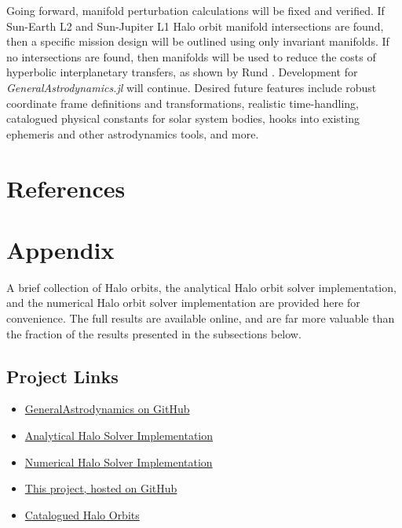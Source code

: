 \documentclass[conf]{new-aiaa}
\renewcommand\refname{}
\begin{document}
\begin{multicols}{2}
Going forward, manifold perturbation calculations will be fixed and verified.
If Sun-Earth L2 and Sun-Jupiter L1 Halo orbit manifold intersections are 
found, then a specific mission design will be 
outlined using only invariant manifolds. If no intersections are found,
then manifolds will be used to reduce the costs of hyperbolic 
interplanetary transfers, as shown by Rund \cite{rund2018interplanetary}.
Development for \textit{GeneralAstrodynamics.jl} will continue. Desired 
future features include robust coordinate frame definitions and 
transformations, realistic time-handling, catalogued physical constants 
for solar system bodies, hooks into existing ephemeris and other 
astrodynamics tools, and more. 

\section{References}
\nocite{*}
\renewcommand\refname{\vskip -0.9cm}


\end{multicols}

\section{Appendix}

A brief collection of Halo orbits, the analytical Halo orbit solver
implementation, and the numerical Halo orbit solver implementation 
are provided here for convenience. The full results are available online,
and are far more valuable than the fraction of the results presented in 
the subsections below. 

\subsection*{Project Links}
\begin{itemize}
    \item \href{https://github.com/cadojo/GeneralAstrodynamics.jl}{GeneralAstrodynamics on GitHub}
    \item \href{https://github.com/cadojo/GeneralAstrodynamics.jl/blob/main/src/AstrodynamicsCore/CR3BP/CR3BPCalculations.jl}{Analytical Halo Solver Implementation}
    \item \href{https://github.com/cadojo/GeneralAstrodynamics.jl/blob/main/src/Propagators/CR3BP/Halos.jl}{Numerical Halo Solver Implementation}
    \item \href{https://github.com/cadojo/Halo-Orbit-Explorations}{This project, hosted on GitHub}
    \item \href{https://github.com/cadojo/Halo-Orbit-Explorations/blob/main/data/exp_pro/halos}{Catalogued Halo Orbits}
\end{itemize}
\end{document}
